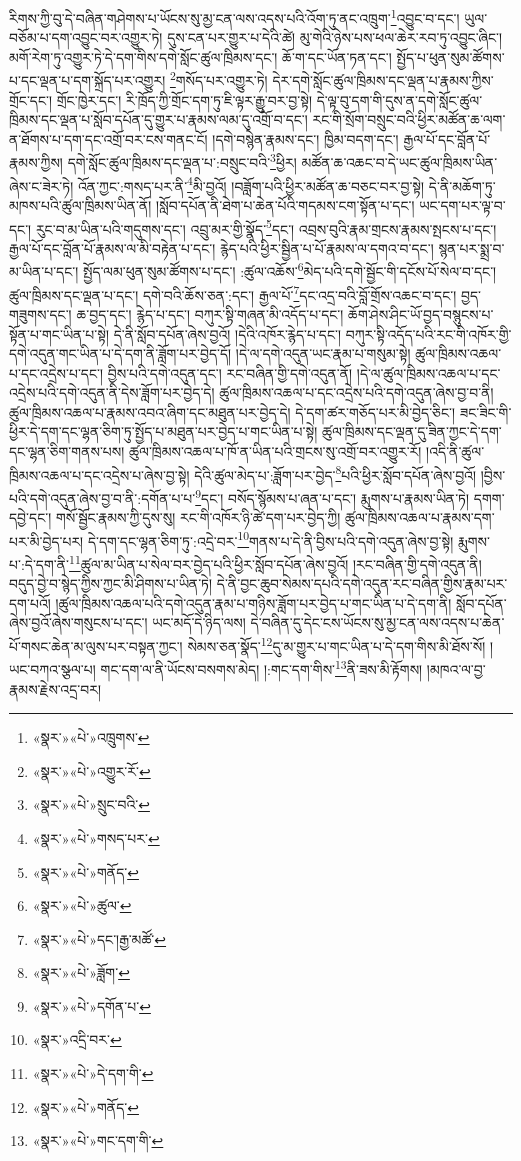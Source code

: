 རིགས་ཀྱི་བུ་དེ་བཞིན་གཤེགས་པ་ཡོངས་སུ་མྱ་ངན་ལས་འདས་པའི་འོག་ཏུ་ནང་འཁྲུག་\footnote{«སྣར་»«པེ་»འཁྲུགས་}འབྱུང་བ་དང་། ཡུལ་བཅོམ་པ་དག་འབྱུང་བར་འགྱུར་ཏེ། དུས་ངན་པར་གྱུར་པ་དེའི་ཚེ། མུ་གེའི་ཉེས་པས་ཕལ་ཆེར་རབ་ཏུ་འབྱུང་ཞིང་། མགོ་རེག་ཏུ་འགྱུར་ཏེ་དེ་དག་གིས་དགེ་སློང་ཚུལ་ཁྲིམས་དང་། ཆོ་ག་དང་ཡོན་ཏན་དང་། སྤྱོད་པ་ཕུན་སུམ་ཚོགས་པ་དང་ལྡན་པ་དག་སྐྲོད་པར་འགྱུར། \footnote{«སྣར་»«པེ་»འགྱུར་རོ་}གསོད་པར་འགྱུར་ཏེ། དེར་དགེ་སློང་ཚུལ་ཁྲིམས་དང་ལྡན་པ་རྣམས་ཀྱིས་གྲོང་དང་། གྲོང་ཁྱེར་དང་། རི་ཁྲོད་ཀྱི་གྲོང་དག་ཏུ་ཇི་ལྟར་རྒྱུ་བར་བྱ་སྟེ། དེ་ལྟ་བུ་དག་གི་དུས་ན་དགེ་སློང་ཚུལ་ཁྲིམས་དང་ལྡན་པ་སློབ་དཔོན་དུ་གྱུར་པ་རྣམས་ལམ་དུ་འགྲོ་བ་དང་། རང་གི་སྲོག་བསྲུང་བའི་ཕྱིར་མཚོན་ཆ་ལག་ན་ཐོགས་པ་དག་དང་འགྲོ་བར་ངས་གནང་ངོ། །དགེ་བསྙེན་རྣམས་དང་། ཁྱིམ་བདག་དང་། རྒྱལ་པོ་དང་བློན་པོ་རྣམས་ཀྱིས། དགེ་སློང་ཚུལ་ཁྲིམས་དང་ལྡན་པ་:བསྲུང་བའི་\footnote{«སྣར་»«པེ་»སྲུང་བའི་}ཕྱིར། མཚོན་ཆ་འཆང་བ་དེ་ཡང་ཚུལ་ཁྲིམས་ཡིན་ཞེས་ང་ཟེར་ཏེ། འོན་ཀྱང་:གསད་པར་ནི་\footnote{«སྣར་»«པེ་»གསད་པར་}མི་བྱའོ། །བཟློག་པའི་ཕྱིར་མཚོན་ཆ་བཅང་བར་བྱ་སྟེ། དེ་ནི་མཆོག་ཏུ་མཁས་པའི་ཚུལ་ཁྲིམས་ཡིན་ནོ། །སློབ་དཔོན་ནི་ཐེག་པ་ཆེན་པོའི་གདམས་ངག་སྟོན་པ་དང་། ཡང་དག་པར་ལྟ་བ་དང་། རུང་བ་མ་ཡིན་པའི་གདུགས་དང་། འབྲུ་མར་གྱི་སྣོད་\footnote{«སྣར་»«པེ་»གནོད་}དང་། འབྲས་བུའི་རྣམ་གྲངས་རྣམས་སྤངས་པ་དང་། རྒྱལ་པོ་དང་བློན་པོ་རྣམས་ལ་མི་བརྟེན་པ་དང་། རྙེད་པའི་ཕྱིར་སྦྱིན་པ་པོ་རྣམས་ལ་དགའ་བ་དང་། སྙན་པར་སྨྲ་བ་མ་ཡིན་པ་དང་། སྤྱོད་ལམ་ཕུན་སུམ་ཚོགས་པ་དང་། :ཚུལ་འཆོས་\footnote{«སྣར་»«པེ་»ཚུལ་}མེད་པའི་དགེ་སྦྱོང་གི་དངོས་པོ་སེལ་བ་དང་། ཚུལ་ཁྲིམས་དང་ལྡན་པ་དང་། དགེ་བའི་ཆོས་ཅན་:དང་། རྒྱལ་པོ་\footnote{«སྣར་»«པེ་»དང་།རྒྱ་མཚོ་}དང་འདྲ་བའི་བློ་གྲོས་འཆང་བ་དང་། བྱད་གཟུགས་དང་། ཆ་བྱད་དང་། རྙེད་པ་དང་། བཀུར་སྟི་གཞན་མི་འདོད་པ་དང་། ཆོག་ཤེས་ཤིང་ཡོ་བྱད་བསྙུངས་པ་སྟོན་པ་གང་ཡིན་པ་སྟེ། དེ་ནི་སློབ་དཔོན་ཞེས་བྱའོ། །དེའི་འཁོར་རྙེད་པ་དང་། བཀུར་སྟི་འདོད་པའི་རང་གི་འཁོར་གྱི་དགེ་འདུན་གང་ཡིན་པ་དེ་དག་ནི་ཟློག་པར་བྱེད་དོ། །དེ་ལ་དགེ་འདུན་ཡང་རྣམ་པ་གསུམ་སྟེ། ཚུལ་ཁྲིམས་འཆལ་པ་དང་འདྲེས་པ་དང་། བྱིས་པའི་དགེ་འདུན་དང་། རང་བཞིན་གྱི་དགེ་འདུན་ནོ། །དེ་ལ་ཚུལ་ཁྲིམས་འཆལ་པ་དང་འདྲེས་པའི་དགེ་འདུན་ནི་དེས་ཟློག་པར་བྱེད་དེ། ཚུལ་ཁྲིམས་འཆལ་པ་དང་འདྲེས་པའི་དགེ་འདུན་ཞེས་བྱ་བ་ནི། ཚུལ་ཁྲིམས་འཆལ་པ་རྣམས་འབའ་ཞིག་དང་མཐུན་པར་བྱེད་དེ། དེ་དག་ཚར་གཅོད་པར་མི་བྱེད་ཅིང་། ཟང་ཟིང་གི་ཕྱིར་དེ་དག་དང་ལྷན་ཅིག་ཏུ་སྤྱོད་པ་མཐུན་པར་བྱེད་པ་གང་ཡིན་པ་སྟེ། ཚུལ་ཁྲིམས་དང་ལྡན་དུ་ཟིན་ཀྱང་དེ་དག་དང་ལྷན་ཅིག་གནས་པས། ཚུལ་ཁྲིམས་འཆལ་པ་ཁོ་ན་ཡིན་པའི་གྲངས་སུ་འགྲོ་བར་འགྱུར་རོ། །འདི་ནི་ཚུལ་ཁྲིམས་འཆལ་པ་དང་འདྲེས་པ་ཞེས་བྱ་སྟེ། དེའི་ཚུལ་མེད་པ་:ཟློག་པར་བྱེད་\footnote{«སྣར་»«པེ་»ཟློག་}པའི་ཕྱིར་སློབ་དཔོན་ཞེས་བྱའོ། །བྱིས་པའི་དགེ་འདུན་ཞེས་བྱ་བ་ནི་:དགོན་པ་པ་\footnote{«སྣར་»«པེ་»དགོན་པ་}དང་། བསོད་སྙོམས་པ་ཞན་པ་དང་། རྨུགས་པ་རྣམས་ཡིན་ཏེ། དགག་དབྱེ་དང་། གསོ་སྦྱོང་རྣམས་ཀྱི་དུས་སུ། རང་གི་འཁོར་ཉི་ཚེ་དག་པར་བྱེད་ཀྱི། ཚུལ་ཁྲིམས་འཆལ་པ་རྣམས་དག་པར་མི་བྱེད་པར། དེ་དག་དང་ལྷན་ཅིག་ཏུ་:འདྲེ་བར་\footnote{«སྣར་»འདྲི་བར་}གནས་པ་དེ་ནི་བྱིས་པའི་དགེ་འདུན་ཞེས་བྱ་སྟེ། རྨུགས་པ་:དེ་དག་ནི་\footnote{«སྣར་»«པེ་»དེ་དག་གི་}ཚུལ་མ་ཡིན་པ་སེལ་བར་བྱེད་པའི་ཕྱིར་སློབ་དཔོན་ཞེས་བྱའོ། །རང་བཞིན་གྱི་དགེ་འདུན་ནི། བདུད་བྱེ་བ་སྙེད་ཀྱིས་ཀྱང་མི་ཤིགས་པ་ཡིན་ཏེ། དེ་ནི་བྱང་ཆུབ་སེམས་དཔའི་དགེ་འདུན་རང་བཞིན་གྱིས་རྣམ་པར་དག་པའོ། །ཚུལ་ཁྲིམས་འཆལ་པའི་དགེ་འདུན་རྣམ་པ་གཉིས་ཟློག་པར་བྱེད་པ་གང་ཡིན་པ་དེ་དག་ནི། སློབ་དཔོན་ཞེས་བྱའོ་ཞེས་གསུངས་པ་དང་། ཡང་མདོ་དེ་ཉིད་ལས། དེ་བཞིན་དུ་དེང་ངས་ཡོངས་སུ་མྱ་ངན་ལས་འདས་པ་ཆེན་པོ་གསང་ཆེན་མ་ལུས་པར་བསྟན་ཀྱང་། སེམས་ཅན་སྣོད་\footnote{«སྣར་»«པེ་»གནོད་}དུ་མ་གྱུར་པ་གང་ཡིན་པ་དེ་དག་གིས་མི་ཐོས་སོ། །ཡང་བཀའ་སྩལ་པ། གང་དག་ལ་ནི་ཡོངས་བསགས་མེད། །:གང་དག་གིས་\footnote{«སྣར་»«པེ་»གང་དག་གི་}ནི་ཟས་མི་རྟོགས། །མཁའ་ལ་བྱ་རྣམས་རྗེས་འདྲ་བར། 